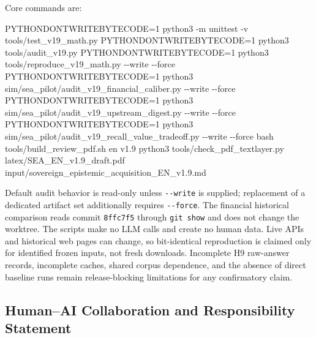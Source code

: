 \documentclass[
  11pt]{article}
\newenvironment{Shaded}{}{}
\newcommand{\AttributeTok}[1]{\textcolor[rgb]{0.49,0.56,0.16}{#1}}
\newcommand{\ExtensionTok}[1]{#1}
\newcommand{\FunctionTok}[1]{\textcolor[rgb]{0.02,0.16,0.49}{#1}}
\newcommand{\NormalTok}[1]{#1}
\newcommand{\OperatorTok}[1]{\textcolor[rgb]{0.40,0.40,0.40}{#1}}
\newcommand{\VariableTok}[1]{\textcolor[rgb]{0.10,0.09,0.49}{#1}}
\begin{document}
Core commands are:

\begin{Shaded}
\begin{Highlighting}[]
\VariableTok{PYTHONDONTWRITEBYTECODE}\OperatorTok{=}\NormalTok{1 }\ExtensionTok{python3} \AttributeTok{{-}m}\NormalTok{ unittest }\AttributeTok{{-}v}\NormalTok{ tools/test\_v19\_math.py}
\VariableTok{PYTHONDONTWRITEBYTECODE}\OperatorTok{=}\NormalTok{1 }\ExtensionTok{python3}\NormalTok{ tools/audit\_v19.py}
\VariableTok{PYTHONDONTWRITEBYTECODE}\OperatorTok{=}\NormalTok{1 }\ExtensionTok{python3}\NormalTok{ tools/reproduce\_v19\_math.py }\AttributeTok{{-}{-}write} \AttributeTok{{-}{-}force}
\VariableTok{PYTHONDONTWRITEBYTECODE}\OperatorTok{=}\NormalTok{1 }\ExtensionTok{python3}\NormalTok{ sim/sea\_pilot/audit\_v19\_financial\_caliber.py }\AttributeTok{{-}{-}write} \AttributeTok{{-}{-}force}
\VariableTok{PYTHONDONTWRITEBYTECODE}\OperatorTok{=}\NormalTok{1 }\ExtensionTok{python3}\NormalTok{ sim/sea\_pilot/audit\_v19\_upstream\_digest.py }\AttributeTok{{-}{-}write} \AttributeTok{{-}{-}force}
\VariableTok{PYTHONDONTWRITEBYTECODE}\OperatorTok{=}\NormalTok{1 }\ExtensionTok{python3}\NormalTok{ sim/sea\_pilot/audit\_v19\_recall\_value\_tradeoff.py }\AttributeTok{{-}{-}write} \AttributeTok{{-}{-}force}
\FunctionTok{bash}\NormalTok{ tools/build\_review\_pdf.sh en v1.9}
\ExtensionTok{python3}\NormalTok{ tools/check\_pdf\_textlayer.py latex/SEA\_EN\_v1.9\_draft.pdf input/sovereign\_epistemic\_acquisition\_EN\_v1.9.md}
\end{Highlighting}
\end{Shaded}

Default audit behavior is read-only unless \texttt{-\/-write} is
supplied; replacement of a dedicated artifact set additionally requires
\texttt{-\/-force}. The financial historical comparison reads commit
\texttt{8ffc7f5} through \texttt{git\ show} and does not change the
worktree. The scripts make no LLM calls and create no human data. Live
APIs and historical web pages can change, so bit-identical reproduction
is claimed only for identified frozen inputs, not fresh downloads.
Incomplete H9 raw-answer records, incomplete caches, shared corpus
dependence, and the absence of direct baseline runs remain
release-blocking limitations for any confirmatory claim.

\subsection{Human--AI Collaboration and Responsibility
Statement}\label{humanai-collaboration-and-responsibility-statement}
\end{document}

